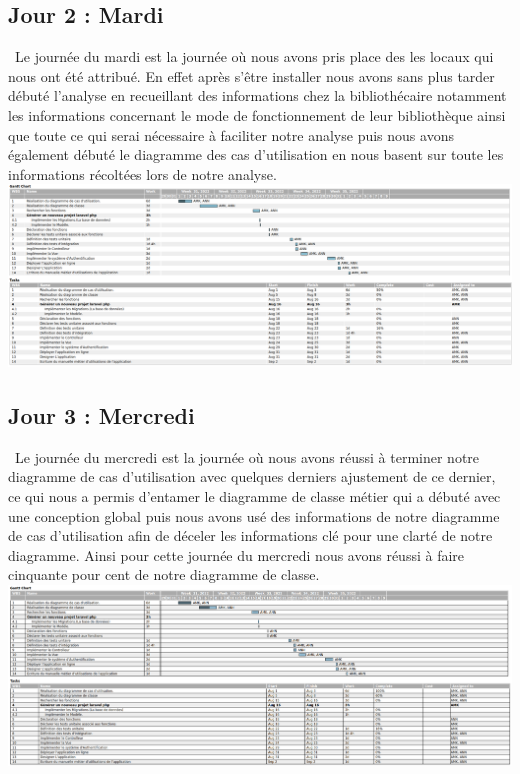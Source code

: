 \documentclass[12pt,a4paper]{article}
\begin{document}
\subsection{Jour 2 : Mardi}
\ Le journée du mardi est la journée où nous avons pris place des les locaux qui nous ont été attribué. En effet après s’être installer nous avons sans plus tarder débuté l’analyse en recueillant des informations chez la bibliothécaire notamment les informations concernant le mode de fonctionnement de leur bibliothèque ainsi que toute ce qui serai nécessaire à faciliter notre analyse puis nous avons également débuté le diagramme des cas d’utilisation en nous basent sur toute les informations récoltées lors de notre analyse.\\
\includegraphics[scale=0.25]{images/jour2.png}\\

\subsection{Jour 3 : Mercredi}
\ Le journée du mercredi est la journée où nous avons réussi à terminer notre diagramme de cas d’utilisation avec quelques derniers ajustement de ce dernier, ce qui nous a permis d’entamer le diagramme de classe métier qui a débuté avec une conception global puis nous avons usé des informations de notre diagramme de cas d’utilisation afin de déceler les informations clé pour une clarté de notre diagramme. Ainsi pour cette journée du mercredi nous avons réussi à faire cinquante pour cent de notre diagramme de classe.\\
\includegraphics[scale=0.25]{images/jour3.png}
\end{document}
